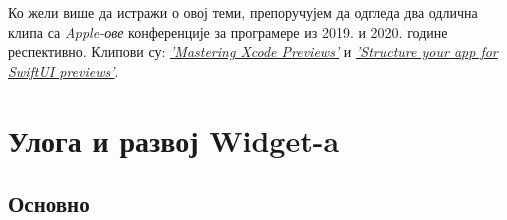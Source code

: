 \documentclass[12pt,oneside]{memoir}
\begin{document}

\indent Ко жели више да истражи о овој теми, препоручујем да одгледа два одлична клипа са \textit{Apple-ове} конференције за програмере из 2019. и 2020. године респективно. Клипови су: \href{https://developer.apple.com/videos/play/wwdc2019/233/}{\textit{'Mastering Xcode Previews'}} и \href{https://developer.apple.com/videos/play/wwdc2020/10149/}{\textit{'Structure your app for SwiftUI previews'}}.

\chapter{Улога и развој Widget-a}

\section{Основно}
\end{document}
